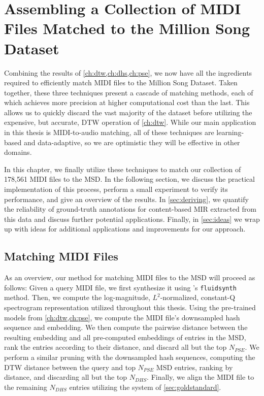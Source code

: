 \chapter{Assembling a Collection of MIDI Files Matched to the Million Song Dataset}
\label{ch:assembling}

Combining the results of \cref{ch:dtw,ch:dhs,ch:pse}, we now have all the ingredients required to efficiently match MIDI files to the Million Song Dataset.
Taken together, these three techniques present a cascade of matching methods, each of which achieves more precision at higher computational cost than the last.
This allows us to quickly discard the vast majority of the dataset before utilizing the expensive, but accurate, DTW operation of \cref{ch:dtw}.
While our main application in this thesis is MIDI-to-audio matching, all of these techniques are learning-based and data-adaptive, so we are optimistic they will be effective in other domains.

In this chapter, we finally utilize these techniques to match our collection of 178,561 MIDI files to the MSD.
In the following section, we discuss the practical implementation of this process, perform a small experiment to verify its performance, and give an overview of the results.
In \cref{sec:deriving}, we quantify the reliability of ground-truth annotations for content-based MIR extracted from this data and discuss further potential applications.
Finally, in \cref{sec:ideas} we wrap up with ideas for additional applications and improvements for our approach.

\section{Matching MIDI Files}

As an overview, our method for matching MIDI files to the MSD will proceed as follows:
Given a query MIDI file, we first synthesize it using \prettymidi{}'s \texttt{fluidsynth} method.
Then, we compute the log-magnitude, $L^2$-normalized, constant-Q spectrogram representation utilized throughout this thesis.
Using the pre-trained models from \cref{ch:dtw,ch:pse}, we compute the MIDI file's downsampled hash sequence and embedding.
We then compute the pairwise distance between the resulting embedding and all pre-computed embeddings of entries in the MSD, rank the entries according to their distance, and discard all but the top $N_{PSE}$.
We perform a similar pruning with the downsampled hash sequences, computing the DTW distance between the query and top $N_{PSE}$ MSD entries, ranking by distance, and discarding all but the top $N_{DHS}$.
Finally, we align the MIDI file to the remaining $N_{DHS}$ entries utilizing the system of \cref{sec:goldstandard}.

